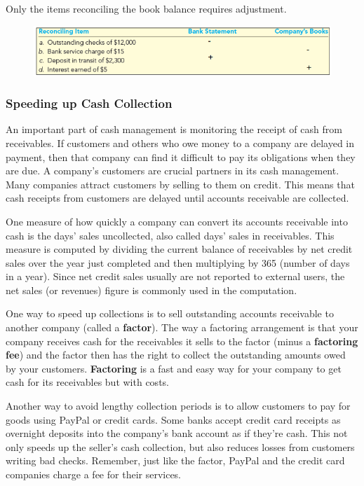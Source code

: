 \documentclass[../main.tex]{subfiles}
\begin{document}
	Only the items reconciling the book balance requires adjustment. 
	
	
	\begin{figure}[ht]
		\centering
		\includegraphics[width=1\columnwidth]{images/c5/reconciliation_example.png}
	\end{figure}

	\subsubsection{Speeding up Cash Collection}
	
	An important part of cash management is monitoring the receipt of cash 
		from receivables. If 
	customers and others who owe money to a company are delayed in payment, 
	then that company can find 
	it difficult to pay its obligations when they are due. A company’s 
	customers are crucial partners 
	in its cash management. Many companies attract customers by selling to them 
	on credit. This means 
	that cash receipts from customers are delayed until accounts receivable are 
	collected. 
	
	One measure 
	of how quickly a company can convert its accounts receivable into cash is 
	the days’ sales 
	uncollected, also called days’ sales in receivables. This measure is 
	computed by dividing the 
	current balance of receivables by net credit sales over the year just 
	completed and then 
	multiplying by 365 (number of days in a year). Since net credit sales 
	usually are not reported to 
	external users, the net sales (or revenues) figure is commonly used in the 
	computation.
		
	One way to speed up collections is to sell outstanding accounts 
	receivable to another company (called a \textbf{factor}). The way a 
	factoring 
	arrangement is that your company receives cash for the receivables it sells 
	to the factor (minus a \textbf{factoring fee}) and the factor then has the 
	right to collect the outstanding amounts owed by your customers. 
	\textbf{Factoring} is a fast and 
	easy way for your company to get cash for its receivables but with costs.
	
	Another way to avoid lengthy collection periods is to allow customers to 
	pay for goods using PayPal or credit cards. Some banks accept credit card 
	receipts as overnight deposits into the company’s bank account as if 
	they’re cash. This not only speeds up the seller’s cash collection, but 
	also reduces losses from customers writing bad checks. Remember, just like 
	the factor, PayPal and the credit card companies charge a fee for their 
	services.
	
	
\end{document}
